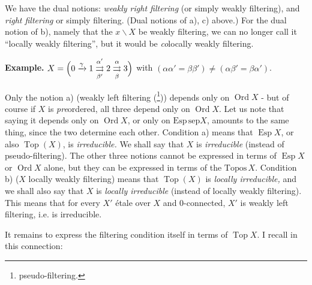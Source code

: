 
\noindent We have the dual notions: \textit{weakly right filtering} (or simply weakly filtering), and \textit{right filtering} or simply filtering. (Dual notions of a), c) above.) For the dual notion of b), namely that the $x\backslash X$ be weakly filtering, we can no longer call it ``locally weakly filtering'', but it would be \textit{co}locally weakly filtering.

\noindent\textbf{Example.} $X = \Bigl(0 \xrightarrow{\gamma} 1 \underset{\beta'}{\overset{\alpha'}{\rightrightarrows}} 2 \underset{\beta}{\overset{\alpha}{\rightrightarrows}} 3\Bigr)$ with $(\alpha\alpha' = \beta\beta') \neq (\alpha\beta' = \beta\alpha')$.


\noindent Only the notion a) (weakly left filtering (\footnote[22]{pseudo-filtering.})) depends only on $\operatorname{Ord} X$ - but of course if $X$ is \textit{pre}ordered, all three depend only on $\operatorname{Ord} X$. Let us note that saying it depends only on $\operatorname{Ord} X$, or only on $\mathrm{Esp}\,\mathrm{sep}X$, amounts to the same thing, since the two determine each other. Condition a) means that $\operatorname{Esp} X$, or also $\operatorname{Top}(X)$, is \textit{irreducible.} We shall say that $X$ is \textit{irreducible} (instead of pseudo-filtering). The other three notions cannot be expressed in terms of $\operatorname{Esp} X$ or $\operatorname{Ord} X$ alone, but they can be expressed in terms of the $\mathrm{Topos}\, X$. Condition b) ($X$ locally weakly filtering) means that $\operatorname{Top}(X)$ is \textit{locally irreducible,} and we shall also say that $X$ is \textit{locally irreducible} (instead of locally weakly filtering). This means that for every $X'$ étale over $X$ and 0-connected, $X'$ is weakly left filtering, i.e. is irreducible.

It remains to express the filtering condition itself in terms of $\operatorname{Top} X$. I recall in this connection:

